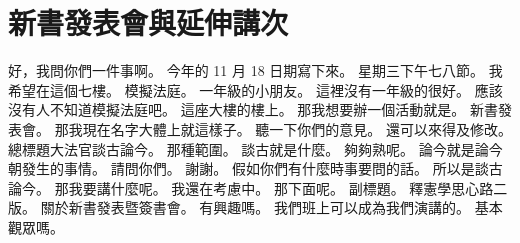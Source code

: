 \section{新書發表會與延伸講次}

\hypertarget{c01:cue:78}{}好，我問你們一件事啊。
\hypertarget{c01:cue:79}{}今年的 11 月 18 日期寫下來。
\hypertarget{c01:cue:80}{}星期三下午七八節。
\hypertarget{c01:cue:81}{}我希望在這個七樓。
\hypertarget{c01:cue:82}{}模擬法庭。
\hypertarget{c01:cue:83}{}一年級的小朋友。
\hypertarget{c01:cue:84}{}這裡沒有一年級的很好。
\hypertarget{c01:cue:85}{}應該沒有人不知道模擬法庭吧。
\hypertarget{c01:cue:86}{}這座大樓的樓上。
\hypertarget{c01:cue:87}{}那我想要辦一個活動就是。
\hypertarget{c01:cue:88}{}新書發表會。
\hypertarget{c01:cue:89}{}那我現在名字大體上就這樣子。
\hypertarget{c01:cue:90}{}聽一下你們的意見。
\hypertarget{c01:cue:91}{}還可以來得及修改。
\hypertarget{c01:cue:92}{}總標題大法官談古論今。
\hypertarget{c01:cue:93}{}那種範圍。
\hypertarget{c01:cue:94}{}談古就是什麼。
\hypertarget{c01:cue:95}{}夠夠熟呢。
\hypertarget{c01:cue:96}{}論今就是論今朝發生的事情。
\hypertarget{c01:cue:97}{}請問你們。
\hypertarget{c01:cue:98}{}謝謝。
\hypertarget{c01:cue:99}{}假如你們有什麼時事要問的話。
\hypertarget{c01:cue:100}{}所以是談古論今。
\hypertarget{c01:cue:101}{}那我要講什麼呢。
\hypertarget{c01:cue:102}{}我還在考慮中。
\hypertarget{c01:cue:103}{}那下面呢。
\hypertarget{c01:cue:104}{}副標題。
\hypertarget{c01:cue:105}{}釋憲學思心路二版。
\hypertarget{c01:cue:106}{}關於新書發表暨簽書會。
\hypertarget{c01:cue:107}{}有興趣嗎。
\hypertarget{c01:cue:108}{}我們班上可以成為我們演講的。
\hypertarget{c01:cue:109}{}基本觀眾嗎。

